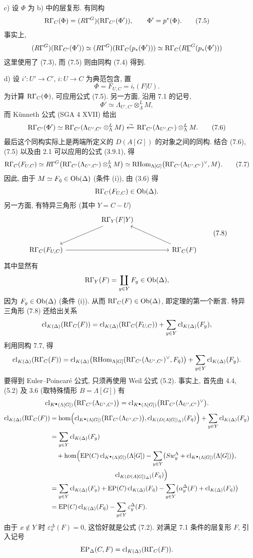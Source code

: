 c) 设 $\Phi$ 为 b) 中的层复形. 有同构
\[
\mathrm R\Gamma_C(\Phi)=(R\Gamma^G)(\mathrm R\Gamma_{C'}(\Phi')),
\qquad \Phi'=p^*(\Phi).
\tag{7.5}
\]
事实上,
\[
(R\Gamma^G)(\mathrm R\Gamma_{C'}(\Phi'))
\simeq
(R\Gamma^G)(\mathrm R\Gamma_C(p_*(\Phi')))
\simeq
\mathrm R\Gamma_C(R\underline{\Gamma}^G(p_*(\Phi')))
\]
这里使用了 (7.3), 而 (7.5) 则由同构 (7.4) 得到.

d) 设 $i':U'\to C'$, $i:U\to C$ 为典范包含, 置
\[
\Phi=F_{U,C}=i_!(F|U).
\]
为计算 $\mathrm R\Gamma_C(\Phi)$, 可应用公式 (7.5). 另一方面, 沿用 7.1 的记号,
\[
\Phi'\simeq \Lambda_{U',C'}\otimes_\Lambda^L M,
\]
而 Künneth 公式 (SGA 4 XVII) 给出
\[
\mathrm R\Gamma_{C'}(\Phi')
\simeq
\mathrm R\Gamma_{C'}(\Lambda_{U',C'}\otimes_\Lambda^L M)
\xleftarrow{\sim}
\mathrm R\Gamma_{C'}(\Lambda_{U',C'})\otimes_\Lambda^L M.
\tag{7.6}
\]
最后这个同构实际上是两端所定义的 $D(A[G])$ 的对象之间的同构. 结合 (7.6), (7.5) 以及由 2.1 可以应用的公式 (3.9.1), 得
\[
\mathrm R\Gamma_C(F_{U,C})
\simeq
R\Gamma^G\bigl(\mathrm R\Gamma_{C'}(\Lambda_{U',C'})\otimes_\Lambda^L M\bigr)
\simeq
\mathrm{RHom}_{\Lambda[G]}\bigl(\mathrm R\Gamma_{C'}(\Lambda_{U',C'})^\vee,M\bigr).
\tag{7.7}
\]
因此, 由于 $M\simeq F_{\bar\eta}\in\operatorname{Ob}(\Delta)$ (条件 (i)), 由 (3.6) 得
\[
\mathrm R\Gamma_C(F_{U,C})\in\operatorname{Ob}(\Delta).
\]
另一方面, 有特异三角形 (其中 $Y=C-U$)
\[
\begin{tikzcd}[column sep=huge,row sep=large]
& \RG_Y(F|Y) \arrow[dl] & \\
\RG_C(F_{U,C}) \arrow[rr] && \RG_C(F) \arrow[ul]
\end{tikzcd}
\tag{7.8}
\]
其中显然有
\[
\mathrm R\Gamma_Y(F)=\coprod_{y\in Y}F_y\in\operatorname{Ob}(\Delta),
\]
因为 $F_y\in\operatorname{Ob}(\Delta)$ (条件 (i)). 从而 $\mathrm R\Gamma_C(F)\in\operatorname{Ob}(\Delta)$, 即定理的第一个断言. 特异三角形 (7.8) 还给出关系
\[
\operatorname{cl}_{K(\Delta)}(\mathrm R\Gamma_C(F))
=
\operatorname{cl}_{K(\Delta)}(\mathrm R\Gamma_C(F_{U,C}))
+\sum_{y\in Y}\operatorname{cl}_{K(\Delta)}(F_y),
\]
利用同构 7.7, 得
\[
\operatorname{cl}_{K(\Delta)}(\mathrm R\Gamma_C(F))
=
\operatorname{cl}_{K(\Delta)}\bigl(\mathrm{RHom}_{\Lambda[G]}(\mathrm R\Gamma_{C'}(\Lambda_{U',C'})^\vee,F_{\bar\eta})\bigr)
+\sum_{y\in Y}\operatorname{cl}_{K(\Delta)}(F_y).
\]
要得到 Euler--Poincaré 公式, 只须再使用 Weil 公式 (5.2). 事实上, 首先由 4.4, (5.2) 及 3.6 (取特殊情形 $B=\Lambda[G]$) 有
\[
\operatorname{cl}_{K^{\bullet}(\Lambda[G])}\bigl(\mathrm R\Gamma_{C'}(\Lambda_{U',C'})\bigr)
=
\operatorname{cl}_{K^{\bullet}(\Lambda[G])}\bigl(\mathrm R\Gamma_{C'}(\Lambda_{U',C'})^\vee\bigr).
\]
\[
\begin{aligned}
\clK{\Delta}(\RG_C(F))
&=\operatorname{hom}\Bigl(
\clKstar{\Lambda[G]}\bigl(\RG_{C'}(\Lambda_{U',C'})\bigr),
\cl_{K(D(A[G])_\Delta)}(F_{\bar\eta})\Bigr)
 +\sum_{y\in Y}\clK{\Delta}(F_y)\\
&=\sum_{y\in Y}\clK{\Delta}(F_y)\\
&\quad +\operatorname{hom}\Bigl(
\EP(C)\clKstar{\Lambda[G]}(\Lambda[G])
 -\sum_{y\in Y}\bigl(Sw_y^{\Lambda}+\clKstar{\Lambda[G]}(\Lambda[G])\bigr),\\
&\hspace{10em}\cl_{K(D(A[G])_\Delta)}(F_{\bar\eta})\Bigr)\\
&=\sum_{y\in Y}\clK{\Delta}(F_y)
 +\EP(C)\clK{\Delta}(F_{\bar\eta})
 -\sum_{y\in Y}\bigl(\alpha_y^\Delta(F)+\clK{\Delta}(F_{\bar\eta})\bigr)\\
&=\EP(C)\clK{\Delta}(F_{\bar\eta})
 -\sum_{y\in Y}\varepsilon_y^\Delta(F).
\end{aligned}
\]
由于 $x\notin Y$ 时 $\varepsilon_x^\Delta(F)=0$, 这恰好就是公式 (7.2). 对满足 7.1 条件的层复形 $F$, 引入记号
\[
\operatorname{EP}_\Delta(C,F)=\operatorname{cl}_{K(\Delta)}(\mathrm R\Gamma_C(F)).
\]

